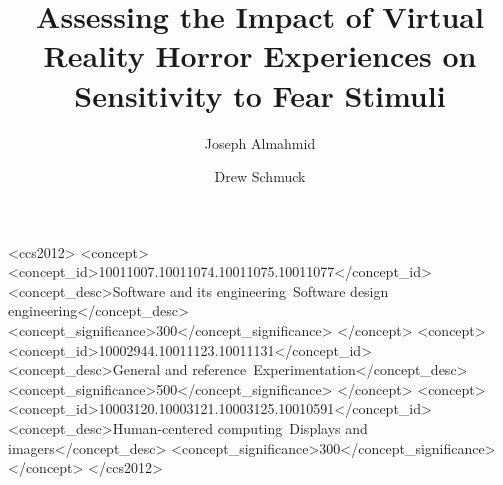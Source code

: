 \documentclass[manuscript,screen,review]{acmart}
\begin{document}
\title{Assessing the Impact of Virtual Reality Horror Experiences on Sensitivity to Fear 
Stimuli}

\author{Joseph Almahmid}
\author{Drew Schmuck}

\renewcommand{\shortauthors}{Almahmid and Schmuck}

\begin{CCSXML}
<ccs2012>
   <concept>
       <concept_id>10011007.10011074.10011075.10011077</concept_id>
       <concept_desc>Software and its engineering~Software design engineering</concept_desc>
       <concept_significance>300</concept_significance>
       </concept>
   <concept>
       <concept_id>10002944.10011123.10011131</concept_id>
       <concept_desc>General and reference~Experimentation</concept_desc>
       <concept_significance>500</concept_significance>
       </concept>
   <concept>
       <concept_id>10003120.10003121.10003125.10010591</concept_id>
       <concept_desc>Human-centered computing~Displays and imagers</concept_desc>
       <concept_significance>300</concept_significance>
       </concept>
 </ccs2012>
\end{CCSXML}


\end{document}
